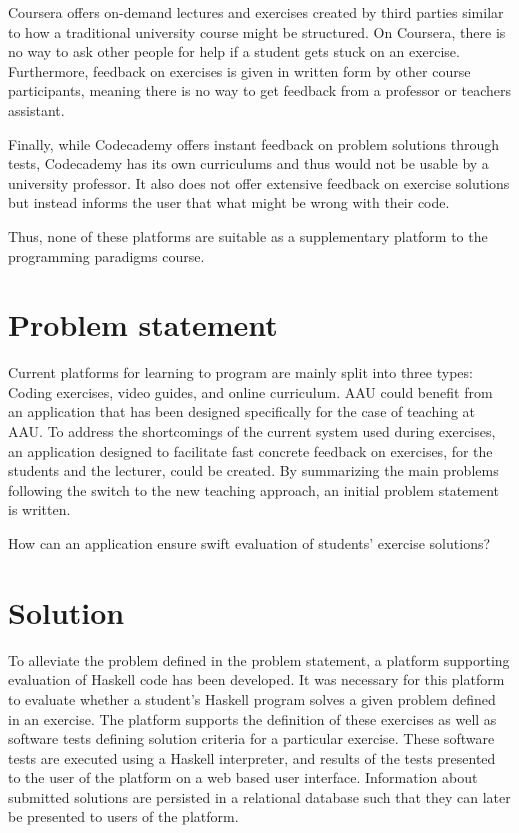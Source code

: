 Coursera offers on-demand lectures and exercises created by third parties similar to how a traditional university course might be structured.
On Coursera, there is no way to ask other people for help if a student gets stuck on an exercise.
Furthermore, feedback on exercises is given in written form by other course participants, meaning there is no way to get feedback from a professor or teachers assistant. 


Finally, while Codecademy offers instant feedback on problem solutions through tests, Codecademy has its own curriculums and thus would not be usable by a university professor. 
It also does not offer extensive feedback on exercise solutions but instead informs the user that what might be wrong with their code. 


Thus, none of these platforms are suitable as a supplementary platform to the programming paradigms course. 
\section{Problem statement}
Current platforms for learning to program are mainly split into three types: Coding exercises, video guides, and online curriculum. 
AAU could benefit from an application that has been designed specifically for the case of teaching at AAU.
To address the shortcomings of the current system used during exercises, an application designed to facilitate fast concrete feedback on exercises, for the students and the lecturer, could be created.
By summarizing the main problems following the switch to the new teaching approach, an initial problem statement is written.
\begin{displayquote}
    How can an application ensure swift evaluation of students' exercise solutions?
\end{displayquote} 

\section{Solution}
To alleviate the problem defined in the problem statement, a platform supporting evaluation of Haskell code has been developed. It was necessary for this platform to evaluate whether a student's Haskell program solves a given problem defined in an exercise. The platform supports the definition of these exercises as well as software tests defining solution criteria for a particular exercise. These software tests are executed using a Haskell interpreter, and results of the tests presented to the user of the platform on a web based user interface.  
Information about submitted solutions are persisted in a relational database such that they can later be presented to users of the platform.  

